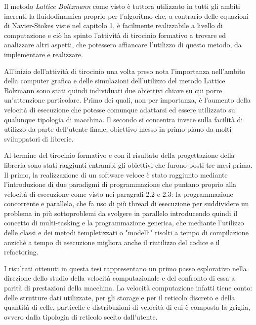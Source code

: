 \large{
Il metodo \textit{Lattice Boltzmann} come visto \`e tuttora utilizzato in tutti gli ambiti inerenti la fluidodinamica proprio per l'algoritmo che, a contrario delle equazioni di Navier-Stokes viste nel capitolo 1, \`e facilmente realizzabile a livello di computazione e ci\`o ha spinto l'attivit\`a di tirocinio formativo a trovare ed analizzare altri aspetti, che potessero affiancare l'utilizzo di questo metodo, da implementare e realizzare.

All'inizio dell'attivit\`a di tirocinio una volta preso nota l'importanza nell'ambito della computer grafica e delle simulazioni dell'utilizzo del metodo Lattice Bolzmann sono stati quindi individuati due obiettivi chiave su cui porre un'attenzione particolare. Primo dei quali, non per importanza, \`e l'aumento della velocit\`a di esecuzione che potesse comunque adattarsi ed essere utilizzato su qualunque tipologia di macchina. Il secondo si concentra invece sulla facilit\`a di utilizzo da parte dell'utente finale, obiettivo messo in primo piano da molti sviluppatori di librerie.

Al termine del tirocinio formativo e con il risultato della progettazione della libreria sono stati raggiunti entrambi gli obiettivi che furono posti tre mesi prima. Il primo, la realizzazione di un software veloce \`e stato raggiunto mediante l'introduzione di due paradigmi di programmazione che puntano proprio alla velocit\`a di esecuzione come visto nei paragrafi 2.2 e 2.3: la programmazione concorrente e parallela, che fa uso di pi\`u thread di esecuzione per suddividere un problema in pi\`u sottoproblemi da svolgere in parallelo introducendo quindi il concetto di multi-tasking e la programmazione generica, che mediante l'utilizzo delle classi e dei metodi templetizzati o "modelli" risolti a tempo di compilazione anzich\`e a tempo di esecuzione migliora anche il riutilizzo del codice e il refactoring.

I risultati ottenuti in questa tesi rappresentano un primo passo esplorativo nella direzione dello studio della velocit\`a computazionale e del confronto di essa a parit\`a di prestazioni della macchina. La velocit\`a computazione infatti tiene conto: delle strutture dati utilizzate, per gli storage e per il reticolo discreto e della quantit\`a di celle, particelle e distribuzioni di velocit\`a di cui \`e composta la griglia, ovvero dalla tipologia di reticolo scelto dall'utente.}
